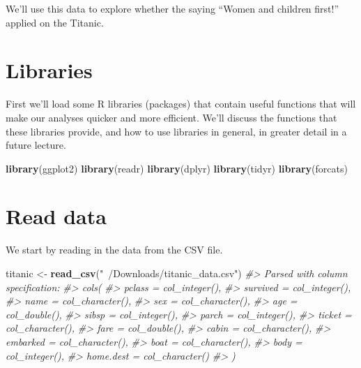 \documentclass[]{book}
\newenvironment{Shaded}{\begin{snugshade}}{\end{snugshade}}
\newcommand{\CommentTok}[1]{\textcolor[rgb]{0.56,0.35,0.01}{\textit{#1}}}
\newcommand{\KeywordTok}[1]{\textcolor[rgb]{0.13,0.29,0.53}{\textbf{#1}}}
\newcommand{\NormalTok}[1]{#1}
\newcommand{\StringTok}[1]{\textcolor[rgb]{0.31,0.60,0.02}{#1}}
\theoremstyle{definition}
\theoremstyle{definition}
\theoremstyle{definition}
\theoremstyle{remark}
\begin{document}
We'll use this data to explore whether the saying ``Women and children
first!'' applied on the Titanic.

\hypertarget{libraries}{%
\section{Libraries}\label{libraries}}

First we'll load some R libraries (packages) that contain useful
functions that will make our analyses quicker and more efficient. We'll
discuss the functions that these libraries provide, and how to use
libraries in general, in greater detail in a future lecture.

\begin{Shaded}
\begin{Highlighting}[]
\KeywordTok{library}\NormalTok{(ggplot2)}
\KeywordTok{library}\NormalTok{(readr)}
\KeywordTok{library}\NormalTok{(dplyr)}
\KeywordTok{library}\NormalTok{(tidyr)}
\KeywordTok{library}\NormalTok{(forcats)}
\end{Highlighting}
\end{Shaded}

\hypertarget{read-data}{%
\section{Read data}\label{read-data}}

We start by reading in the data from the CSV file.

\begin{Shaded}
\begin{Highlighting}[]
\NormalTok{titanic <-}\StringTok{ }\KeywordTok{read_csv}\NormalTok{(}\StringTok{"~/Downloads/titanic_data.csv"}\NormalTok{)}
\CommentTok{#> Parsed with column specification:}
\CommentTok{#> cols(}
\CommentTok{#>   pclass = col_integer(),}
\CommentTok{#>   survived = col_integer(),}
\CommentTok{#>   name = col_character(),}
\CommentTok{#>   sex = col_character(),}
\CommentTok{#>   age = col_double(),}
\CommentTok{#>   sibsp = col_integer(),}
\CommentTok{#>   parch = col_integer(),}
\CommentTok{#>   ticket = col_character(),}
\CommentTok{#>   fare = col_double(),}
\CommentTok{#>   cabin = col_character(),}
\CommentTok{#>   embarked = col_character(),}
\CommentTok{#>   boat = col_character(),}
\CommentTok{#>   body = col_integer(),}
\CommentTok{#>   home.dest = col_character()}
\CommentTok{#> )}
\end{Highlighting}
\end{Shaded}
\end{document}
